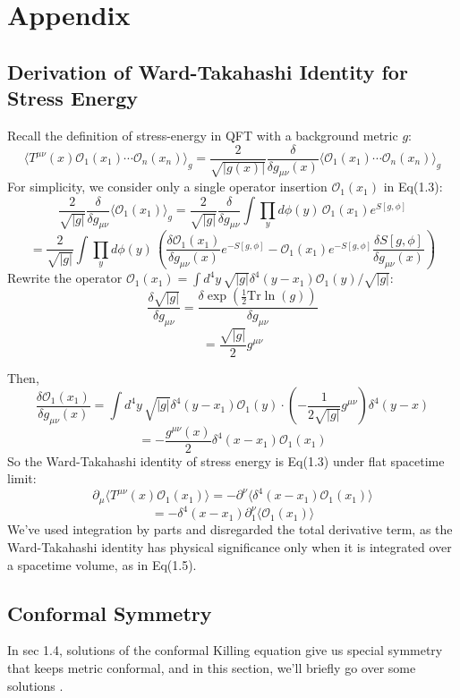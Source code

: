\documentclass[12pt]{article}
\numberwithin{equation}{section}
\newcommand\<\langle
\renewcommand\>\rangle
\renewcommand\.{\cdot}
\newcommand\Tr{\mathrm{Tr}}
\begin{document}
\section*{Appendix}
\subsection*{Derivation of Ward-Takahashi Identity for Stress Energy}
Recall the definition of stress-energy in QFT with a background metric $g$:
\begin{equation*}
    \langle T^{\mu\nu}(x)\mathcal{O}_1(x_1)\cdots\mathcal{O}_n(x_n)\rangle_g = \frac{2}{\sqrt{|g(x)|}}\frac{\delta}{\delta g_{\mu\nu}(x)}\langle\mathcal{O}_1(x_1)\cdots\mathcal{O}_n(x_n)\rangle_{g}
\end{equation*}
For simplicity, we consider only a single operator insertion $\mathcal{O}_1(x_1)$ in Eq(1.3):
\[
    \frac{2}{\sqrt{|g|}}\frac{\delta}{\delta g_{\mu\nu}}\langle\mathcal{O}_1(x_1)\rangle_g = \frac{2}{\sqrt{|g|}}\frac{\delta}{\delta g_{\mu\nu}}\int{\prod_{y}d\phi(y)\,}\mathcal{O}_1(x_1)e^{S[g,\phi]}
\]
\[
    = \frac{2}{\sqrt{|g|}}\int{\prod_{y}d\phi(y)\,}\left(\frac{\delta\mathcal{O}_1(x_1)}{\delta g_{\mu\nu}(x)}e^{-S[g,\phi]} - \mathcal{O}_1(x_1)e^{-S[g,\phi]}\frac{\delta S[g,\phi]}{\delta g_{\mu\nu}(x)}\right)
\]
Rewrite the operator $\mathcal{O}_1(x_1) = \int{d^4y\,} \sqrt{|g|}\delta^4(y-x_1)\mathcal{O}_1(y)/\sqrt{|g|}$:
\[
    \frac{\delta\sqrt{|g|}}{\delta g_{\mu\nu}} = \frac{\delta\exp(\frac{1}{2}\Tr\ln(g))}{\delta g_{\mu\nu}}
\]
\[
    =\frac{\sqrt{|g|}}{2}g^{\mu\nu}
\]

Then,
\[
    \frac{\delta\mathcal{O}_1(x_1)}{\delta g_{\mu\nu}(x)} = \int{d^4y\,\sqrt{|g|}}\delta^4(y-x_1)\mathcal{O}_1(y)\cdot(-\frac{1}{2\sqrt{|g|}}g^{\mu\nu})\delta^4(y-x)
\]
\[
    = -\frac{g^{\mu\nu}(x)}{2}\delta^4(x-x_1)\mathcal{O}_1(x_1)
\]
So the Ward-Takahashi identity of stress energy is Eq(1.3) under flat spacetime limit:
\[
     \partial_{\mu}\langle T^{\mu\nu}(x)\mathcal{O}_1(x_1)\rangle = -\partial^{\nu}\langle\delta^4(x-x_1)\mathcal{O}_1(x_1)\rangle
\]
\[
    = -\delta^4(x-x_1)\partial^{\nu}_{1}\langle\mathcal{O}_1(x_1)\rangle
\]
We've used integration by parts and disregarded the total derivative term, as the Ward-Takahashi identity has physical significance only when it is integrated over a spacetime volume, as in Eq(1.5).
\subsection*{Conformal Symmetry}
In sec 1.4, solutions of the conformal Killing equation give us special symmetry that keeps metric conformal, and in this section, we'll briefly go over some solutions \cite{DiFrancesco:1997nk}.
\end{document}
